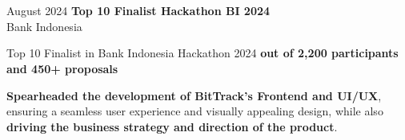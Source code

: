 \documentclass[../main.tex]{subfiles}
\begin{document}
\section{}

\begin{twocolentry}{
    August 2024
}
    \textbf{Top 10 Finalist Hackathon BI 2024}\\
    Bank Indonesia
\end{twocolentry}
\vspace{0.10 cm}
\begin{onecolentry}
\begin{highlights}
    \item Top 10 Finalist in Bank Indonesia Hackathon 2024 \textbf{out of 2,200 participants and 450+ proposals}
    \item \textbf{Spearheaded the development of BitTrack's Frontend and UI/UX}, ensuring a seamless user experience and visually appealing design, while also \textbf{driving the business strategy and direction of the product}.
\end{highlights}
\end{onecolentry}
\end{document}

